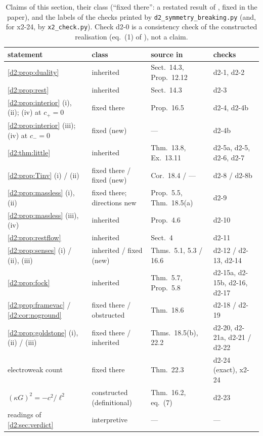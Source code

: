 \begin{table}[t]
\centering
\footnotesize
\begin{tabular}{@{}l>{\raggedright\arraybackslash}p{2.9cm}>{\raggedright\arraybackslash}p{2.7cm}>{\raggedright\arraybackslash}p{3.0cm}@{}}
\toprule
statement & class & source in \cite{ES17} & checks\\
\midrule
\cref{d2:prop:duality} & inherited & Sect.~14.3, Prop.~12.12 & d2-1, d2-2\\
\cref{d2:prop:rest} & inherited & Sect.~14.3 & d2-3\\
\cref{d2:prop:interior} (i), (ii); (iv) at $c_+=0$ & fixed there & Prop.~16.5 & d2-4, d2-4b\\
\cref{d2:prop:interior} (iii); (iv) at $c_-=0$ & fixed (new) & --- & d2-4b\\
\cref{d2:thm:little} & inherited & Thm.~13.8, Ex.~13.11 & d2-5a, d2-5, d2-6, d2-7\\
\cref{d2:prop:Tinv} (i) / (ii) & fixed there / fixed (new) & Cor.~18.4 / --- & d2-8 / d2-8b\\
\cref{d2:prop:massless} (i), (ii) & fixed there; directions new & Prop.~5.5, Thm.~18.5(a) & d2-9\\
\cref{d2:prop:massless} (iii), (iv) & inherited & Prop.~4.6 & d2-10\\
\cref{d2:prop:restflow} & inherited & Sect.~4 & d2-11\\
\cref{d2:prop:senses} (i) / (ii), (iii) & inherited / fixed (new) & Thms.~5.1, 5.3 / 16.6 & d2-12 / d2-13, d2-14\\
\cref{d2:prop:fock} & inherited & Thm.~5.7, Prop.~5.8 & d2-15a, d2-15b, d2-16, d2-17\\
\cref{d2:prop:framevac} / \cref{d2:cor:noground} & fixed there / obstructed & Thm.~18.6 & d2-18 / d2-19\\
\cref{d2:prop:goldstone} (i), (ii) / (iii) & fixed there / inherited & Thms.~18.5(b), 22.2 & d2-20, d2-21a, d2-21 / d2-22\\
electroweak count & fixed there & Thm.~22.3 & d2-24 (exact), x2-24\\
$(\kappa G)^2=-c^2/\ell^2$ & constructed (definitional) & Thm.~16.2, eq.~(7) & d2-23\\
readings of \cref{d2:sec:verdict} & interpretive & --- & ---\\
\bottomrule
\end{tabular}
\caption{Claims of this section, their class (``fixed there'': a restated result of \cite{ES17}, fixed in the paper), and the labels of the checks
printed by \texttt{d2\_symmetry\_breaking.py} (and, for x2-24, by \texttt{x2\_check.py}). Check d2-0 is a consistency check of the constructed
realisation (eq.~(1) of \cite{ES17}), not a claim.}
\label{d2:tab:claims}
\end{table}

